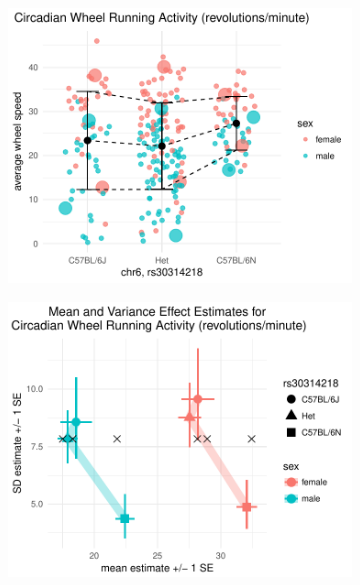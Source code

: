     \begin{figure}
      \begin{subfigure}{0.48\textwidth}
        \includegraphics[width=\textwidth]{images/Kumar_avg_counts_phenotype_plot.pdf}
        \subcaption{\label{fig:kumar_phenotype_plot}}
      \end{subfigure}
      \hfill
      \begin{subfigure}{0.48\textwidth}
        \includegraphics[width=\textwidth]{images/Kumar_avg_counts_mean_var_plot.pdf}
        \subcaption{\label{fig:kumar_meanvar_plot}}
      \end{subfigure}

\end{figure}
